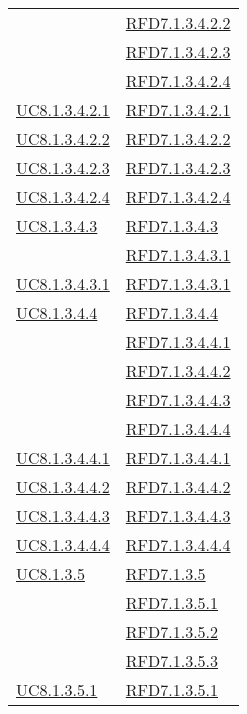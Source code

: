 \begin{longtable}{|>{\centering}m{5cm}|m{5cm}<{\centering}|}
& \hyperlink{RFD7.1.3.4.2.2}{RFD7.1.3.4.2.2}\\
& \hyperlink{RFD7.1.3.4.2.3}{RFD7.1.3.4.2.3}\\
& \hyperlink{RFD7.1.3.4.2.4}{RFD7.1.3.4.2.4}\\ \hline
\hyperref[UC8.1.3.4.2.1]{UC8.1.3.4.2.1} & \hyperlink{RFD7.1.3.4.2.1}{RFD7.1.3.4.2.1}\\ \hline
\hyperref[UC8.1.3.4.2.2]{UC8.1.3.4.2.2} & \hyperlink{RFD7.1.3.4.2.2}{RFD7.1.3.4.2.2}\\ \hline
\hyperref[UC8.1.3.4.2.3]{UC8.1.3.4.2.3} & \hyperlink{RFD7.1.3.4.2.3}{RFD7.1.3.4.2.3}\\ \hline
\hyperref[UC8.1.3.4.2.4]{UC8.1.3.4.2.4} & \hyperlink{RFD7.1.3.4.2.4}{RFD7.1.3.4.2.4}\\ \hline
\hyperref[UC8.1.3.4.3]{UC8.1.3.4.3} & \hyperlink{RFD7.1.3.4.3}{RFD7.1.3.4.3}\\
& \hyperlink{RFD7.1.3.4.3.1}{RFD7.1.3.4.3.1}\\ \hline
\hyperref[UC8.1.3.4.3.1]{UC8.1.3.4.3.1} & \hyperlink{RFD7.1.3.4.3.1}{RFD7.1.3.4.3.1}\\ \hline
\hyperref[UC8.1.3.4.4]{UC8.1.3.4.4} & \hyperlink{RFD7.1.3.4.4}{RFD7.1.3.4.4}\\
& \hyperlink{RFD7.1.3.4.4.1}{RFD7.1.3.4.4.1}\\
& \hyperlink{RFD7.1.3.4.4.2}{RFD7.1.3.4.4.2}\\
& \hyperlink{RFD7.1.3.4.4.3}{RFD7.1.3.4.4.3}\\
& \hyperlink{RFD7.1.3.4.4.4}{RFD7.1.3.4.4.4}\\ \hline
\hyperref[UC8.1.3.4.4.1]{UC8.1.3.4.4.1} & \hyperlink{RFD7.1.3.4.4.1}{RFD7.1.3.4.4.1}\\ \hline
\hyperref[UC8.1.3.4.4.2]{UC8.1.3.4.4.2} & \hyperlink{RFD7.1.3.4.4.2}{RFD7.1.3.4.4.2}\\ \hline
\hyperref[UC8.1.3.4.4.3]{UC8.1.3.4.4.3} & \hyperlink{RFD7.1.3.4.4.3}{RFD7.1.3.4.4.3}\\ \hline
\hyperref[UC8.1.3.4.4.4]{UC8.1.3.4.4.4} & \hyperlink{RFD7.1.3.4.4.4}{RFD7.1.3.4.4.4}\\ \hline
\hyperref[UC8.1.3.5]{UC8.1.3.5} & \hyperlink{RFD7.1.3.5}{RFD7.1.3.5}\\
& \hyperlink{RFD7.1.3.5.1}{RFD7.1.3.5.1}\\
& \hyperlink{RFD7.1.3.5.2}{RFD7.1.3.5.2}\\
& \hyperlink{RFD7.1.3.5.3}{RFD7.1.3.5.3}\\ \hline
\hyperref[UC8.1.3.5.1]{UC8.1.3.5.1} & \hyperlink{RFD7.1.3.5.1}{RFD7.1.3.5.1}\\ \hline

\end{longtable}
